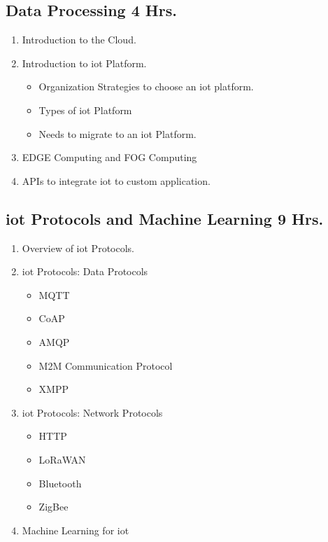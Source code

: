 \subsection{Data Processing \hfill {4 Hrs.}}
\begin{enumerate}
    \item Introduction to the Cloud.
    \item Introduction to \acrfull{iot} Platform.
    \begin{itemize}
        \item Organization Strategies to choose an \acrshort{iot} platform.
        \item Types of \acrfull{iot} Platform
        \item Needs to migrate to an \acrfull{iot} Platform.
    \end{itemize}
    \item EDGE Computing and FOG Computing
    \item APIs to integrate \acrshort{iot} to custom application.
    
\end{enumerate}

\subsection{\acrshort{iot} Protocols and Machine Learning \hfill {9 Hrs.}}
\begin{enumerate}
    \item Overview of \acrshort{iot} Protocols.
    \item \acrfull{iot} Protocols: Data Protocols 
    \begin{itemize}
        \item MQTT
        \item CoAP
        \item AMQP
        \item M2M Communication Protocol
        \item XMPP
    \end{itemize}
    \item \acrfull{iot} Protocols: Network Protocols 
    \begin{itemize}
        \item HTTP
        \item LoRaWAN
        \item Bluetooth
        \item ZigBee
    \end{itemize}
    \item Machine Learning for \acrshort{iot}
\end{enumerate}

